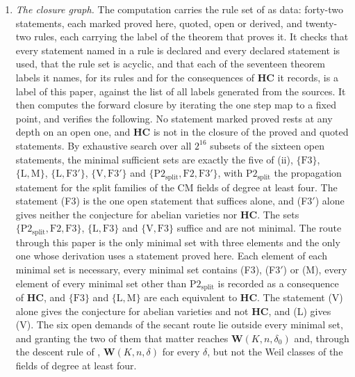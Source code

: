 \begin{enumerate}[label=\textup{(\Roman*)},leftmargin=*]
\item \emph{The closure graph.} The computation carries the rule set of
   as data: forty-two statements, each marked proved here,
  quoted, open or derived, and twenty-two rules, each carrying the label of
  the theorem that proves it. It checks that every statement named in a rule
  is declared and every declared statement is used, that the rule set is
  acyclic, and that each of the seventeen theorem labels it names, for its
  rules and for the consequences of $\mathbf{HC}$ it records, is a label of
  this paper, against the list of all labels generated from the
  sources. It then computes the forward closure by iterating the one step map
  to a fixed point, and verifies the following. No statement marked proved
  rests at any depth on an open one, and $\mathbf{HC}$ is not in the closure
  of the proved and quoted statements. By exhaustive search over all
  $2^{16}$ subsets of the sixteen open statements, the minimal sufficient
  sets are exactly the five of (ii), $\{\mathrm{F3}\}$,
  $\{\mathrm{L},\mathrm{M}\}$, $\{\mathrm{L},\mathrm{F3}'\}$,
  $\{\mathrm{V},\mathrm{F3}'\}$ and
  $\{\mathrm{P2}_{\mathrm{split}},\mathrm{F2},\mathrm{F3}'\}$, with
  $\mathrm{P2}_{\mathrm{split}}$ the propagation statement for the split
  families of the CM fields of degree at least four. The statement (F3) is
  the one open statement that suffices alone, and \textup{(F3$'$)} alone
  gives neither the conjecture for abelian varieties nor $\mathbf{HC}$. The
  sets
  $\{\mathrm{P2}_{\mathrm{split}},\mathrm{F2},\mathrm{F3}\}$,
  $\{\mathrm{L},\mathrm{F3}\}$ and $\{\mathrm{V},\mathrm{F3}\}$ suffice and
  are not minimal. The route through this paper is the only minimal set with
  three elements and the only one whose derivation uses a statement proved
  here. Each element of each minimal set is necessary, every minimal set
  contains (F3), \textup{(F3$'$)} or \textup{(M)}, every element of every
  minimal set other than $\mathrm{P2}_{\mathrm{split}}$ is recorded as a
  consequence of $\mathbf{HC}$, and $\{\mathrm{F3}\}$ and
  $\{\mathrm{L},\mathrm{M}\}$ are each equivalent to $\mathbf{HC}$.
  The statement \textup{(V)} alone gives the conjecture for abelian varieties
  and not $\mathbf{HC}$, and \textup{(L)} gives \textup{(V)}. The six open
  demands of the secant route lie outside every minimal set, and granting the
  two of
  them that matter reaches $\mathbf{W}(K,n,\delta_{0})$ and, through the
  descent rule of , $\mathbf{W}(K,n,\delta)$ for every
  $\delta$, but not the Weil classes of the fields of degree at least four.

\end{enumerate}
